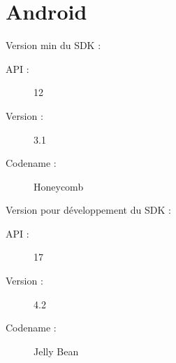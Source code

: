 \section{Android}
Version min du SDK :
\begin{description}
\item[API : ] 12
\item[Version : ] 3.1 
\item[Codename : ] Honeycomb 
\end{description}

Version pour développement du SDK :
\begin{description}
\item[API : ] 17
\item[Version : ] 4.2 
\item[Codename : ] Jelly Bean
\end{description}